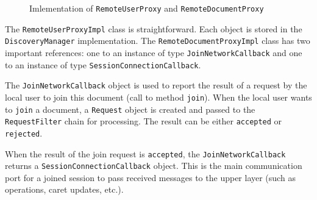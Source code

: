 \begin{figure}[H]
 \centering
 \caption{Imlementation of \texttt{RemoteUserProxy} and \texttt{RemoteDocumentProxy}}
 \label{fig:network.protocol.userimpl.uml}
\end{figure}

The \texttt{RemoteUserProxyImpl} class is straightforward. Each object is stored in the \texttt{DiscoveryManager} implementation. The \texttt{RemoteDocumentProxyImpl} class has two important references: one to an instance of type \texttt{JoinNetworkCallback} and one to an instance of type \texttt{SessionConnectionCallback}. 

The \texttt{JoinNetworkCallback} object is used to report the result of a request by the local user to join this document (call to method \texttt{join}). When the local user wants to \texttt{join} a document, a \texttt{Request} object is created and passed to the \texttt{RequestFilter} chain for processing. The result can be either \texttt{accepted} or \texttt{rejected}.

When the result of the join request is  \texttt{accepted}, the \texttt{JoinNetworkCallback} returns a \texttt{Session\-Connection\-Callback} object. This is the main communication port for a joined session to pass received messages to the upper layer (such as operations, caret updates, etc.).


